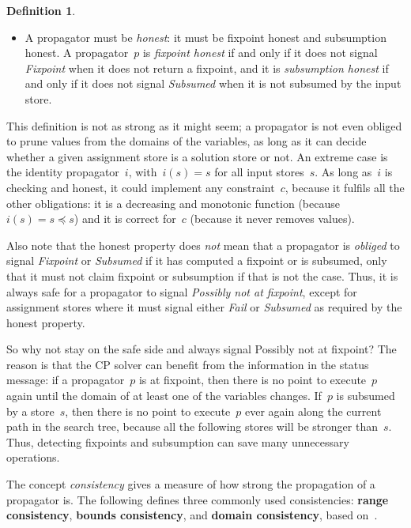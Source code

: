 \documentclass[a4paper,11pt]{article}
\theoremstyle{definition}
\newtheorem{definition}{Definition}
\newcommand{\CTpaper}[0]{DBLP:conf/cp/DemeulenaereHLP16}
\numberwithin{equation}{section}
\begin{document}
\begin{definition}
\begin{itemize}
  \item A propagator must be \emph{honest}: it must be
    fixpoint honest and subsumption honest.
    A propagator~$p$ is \emph{fixpoint honest} if and only if it does not signal
    \emph{Fixpoint} when it does not return a fixpoint, and it is
    \emph{subsumption honest} if and only if it does
    not signal \emph{Subsumed} when it is not subsumed by the input store.

\end{itemize}

\end{definition}
This definition is not as strong as it might seem; a propagator is not even
obliged to prune values from the domains of the variables,
as long as it can decide whether a given
assignment store is a solution store or not.
An extreme case is the identity propagator~$i$, with~$i(s) = s$ for all input stores~$s$.
As long as~$i$ is checking and honest, it could implement any constraint~$c$,
because it fulfils all the other obligations: it is a decreasing and monotonic function
(because~$i(s) = s \preceq s$) and it is correct for~$c$
(because it never removes values).

Also note that the honest property does \emph{not} mean that a
propagator is \emph{obliged} to signal \emph{Fixpoint} or \emph{Subsumed}
if it has computed a fixpoint or is subsumed, only that it must not
claim fixpoint or subsumption if that is not the case.
Thus, it is always safe
for a propagator to signal \emph{Possibly not at fixpoint}, except for
assignment stores where it must signal either \emph{Fail} or \emph{Subsumed}
as required by the honest property.

So why not stay on the safe side and always signal Possibly not at fixpoint?
The reason is that the CP solver can benefit from the information
in the status message: if a propagator~$p$ is at fixpoint, then there is no point
to execute~$p$ again until the domain of at least one of the variables changes.
If~$p$ is subsumed by a store~$s$, then there is no point to execute~$p$
ever again along the current path in the search tree, because all the following
stores will be stronger than~$s$. Thus, detecting fixpoints and subsumption
can save many unnecessary operations.

The concept \emph{consistency} gives a measure of how strong
the propagation of a propagator is.
The following defines three commonly used consistencies:
\textbf{range consistency}, \textbf{bounds consistency},
and \textbf{domain consistency}, based on~\cite{Bessiere06,\CTpaper}.
\end{document}
